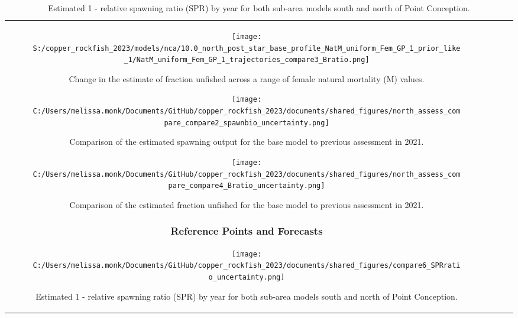 \documentclass[11pt,
  letterpaper,
]{article}
\begin{document}
\begin{longtable}[t]{c>{\centering\arraybackslash}p{2cm}>{\centering\arraybackslash}p{2cm}>{\centering\arraybackslash}p{2cm}}
\pagebreak

\begin{figure}
{\centering
\texttt{[image: S:/copper\_rockfish\_2023/models/nca/10.0\_north\_post\_star\_base\_profile\_NatM\_uniform\_Fem\_GP\_1\_prior\_like\_1/NatM\_uniform\_Fem\_GP\_1\_trajectories\_compare3\_Bratio.png]}
}
\caption{Change in the estimate of fraction unfished across a range of female natural mortality (M) values.\label{fig:m-depl}}
\end{figure}

\begin{figure}
{\centering
\texttt{[image: C:/Users/melissa.monk/Documents/GitHub/copper\_rockfish\_2023/documents/shared\_figures/north\_assess\_compare\_compare2\_spawnbio\_uncertainty.png]}
}
\caption{Comparison of the estimated spawning output for the base model to previous assessment in 2021.\label{fig:comp-assess-sb}}
\end{figure}

\newpage

\begin{figure}
{\centering
\texttt{[image: C:/Users/melissa.monk/Documents/GitHub/copper\_rockfish\_2023/documents/shared\_figures/north\_assess\_compare\_compare4\_Bratio\_uncertainty.png]}
}
\caption{Comparison of the estimated fraction unfished for the base model to previous assessment in 2021.\label{fig:comp-assess-depl}}
\end{figure}

\newpage

\subsubsection{Reference Points and Forecasts}\label{reference-points-and-forecasts}

\begin{figure}
{\centering
\texttt{[image: C:/Users/melissa.monk/Documents/GitHub/copper\_rockfish\_2023/documents/shared\_figures/compare6\_SPRratio\_uncertainty.png]}
}
\caption{Estimated 1 - relative spawning ratio (SPR) by year for both sub-area models south and north of Point Conception.\label{fig:1-spr}}
\end{figure}


\end{longtable}
\end{document}
